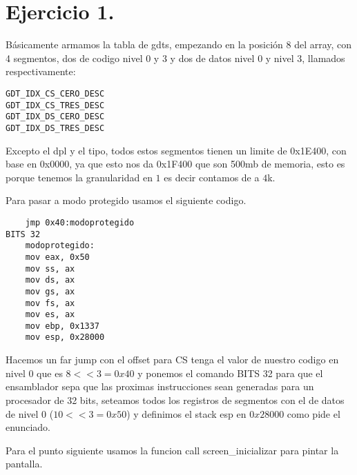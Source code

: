 \section{Ejercicio 1.}
\noindent Básicamente armamos la tabla de gdts, empezando en la posición $8$ del array, con 4 segmentos, dos de codigo nivel $0$ y $3$ y dos de datos nivel $0$ y nivel $3$, llamados respectivamente:

\begin{codesnippet}
\begin{verbatim}
GDT_IDX_CS_CERO_DESC
GDT_IDX_CS_TRES_DESC
GDT_IDX_DS_CERO_DESC
GDT_IDX_DS_TRES_DESC
\end{verbatim}
\end{codesnippet}

\noindent Excepto el dpl y el tipo, todos estos segmentos tienen un limite de 0x1E400, con base en 0x0000, ya que esto nos da 0x1F400 que son 500mb de memoria, esto es porque tenemos la granularidad en $1$ es decir contamos de a $4$k.

\noindent Para pasar a modo protegido usamos el siguiente codigo.
\begin{codesnippet}
\begin{verbatim}
    jmp 0x40:modoprotegido
BITS 32
    modoprotegido:
    mov eax, 0x50
    mov ss, ax
    mov ds, ax
    mov gs, ax
    mov fs, ax
    mov es, ax
    mov ebp, 0x1337
    mov esp, 0x28000
\end{verbatim}
\end{codesnippet}

\noindent Hacemos un far jump con el offset para CS tenga el valor de nuestro codigo en nivel $0$ que es $8 << 3 = 0x40$ y ponemos el comando BITS 32 para que el ensamblador sepa que las proximas instrucciones sean generadas para un procesador de 32 bits, seteamos todos los registros de segmentos con el de datos de nivel $0$ ($10 << 3 = 0x50$) y definimos el stack esp en $0x28000$ como pide el enunciado. 

\noindent Para el punto siguiente usamos la funcion call screen\_inicializar para pintar la pantalla.
